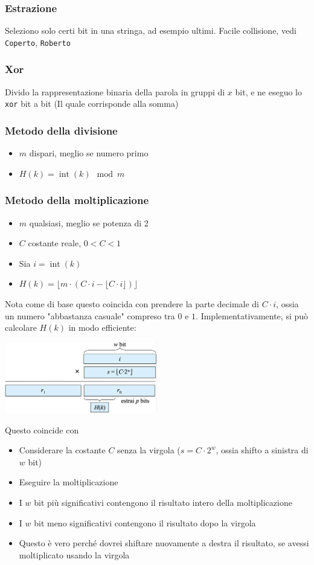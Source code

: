 \subsubsection{Estrazione}
Seleziono solo certi bit in una stringa, ad esempio ultimi. Facile collisione, vedi \verb|Coperto|, \verb|Roberto|
\subsubsection{Xor}
Divido la rappresentazione binaria della parola in gruppi di $ x $ bit, e ne eseguo lo \verb|xor| bit a bit (Il quale corrisponde alla somma)
\subsubsection{Metodo della divisione}
\begin{itemize}
	\item $ m $ dispari, meglio se numero primo
	\item $ H\left(k\right) = \operatorname{int}\left(k\right) \mod m $
\end{itemize}
\subsubsection{Metodo della moltiplicazione}
\begin{itemize}
	\item $m$ qualsiasi, meglio se potenza di 2
	\item $C$ costante reale, $0<C<1$
	\item Sia $i=\operatorname{int}(k)$
	\item $H(k)=\lfloor m \cdot(C \cdot i-\lfloor C \cdot i\rfloor)\rfloor$
\end{itemize}
Nota come di base questo coincida con prendere la parte decimale di $ C \cdot i $, ossia un numero "abbastanza casuale" compreso tra $ 0 $ e $ 1 $.
\vskip3mm
Implementativamente, si può calcolare $ H(k) $ in modo efficiente:
\begin{center}
	\includegraphics[width = 0.5\textwidth]{images/knuth multiplication hash.png}
\end{center}
Questo coincide con
\begin{itemize}
	\item Considerare la costante $ C $ senza la virgola ($ s = C \cdot 2^{w} $, ossia shifto a sinistra di $ w $ bit)
	\item Eseguire la moltiplicazione
	\item I $ w $ bit più significativi contengono il risultato intero della moltiplicazione
	\item I $ w $ bit meno significativi contengono il risultato dopo la virgola
	\item Questo è vero perché dovrei shiftare nuovamente a destra il risultato, se avessi moltiplicato usando la virgola
\end{itemize}

